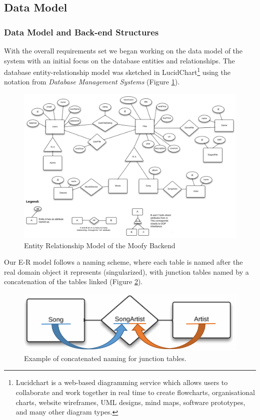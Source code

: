 \subsection{Data Model}
\subsubsection{Data Model and Back-end Structures}
\label{sec:datamodel}

With the overall requirements set we began working on the data model of the system with an initial focus on the database entities and relationships. The database entity-relationship model was sketched in LucidChart\footnote{Lucidchart is a web-based diagramming service which allows users to collaborate and work together in real time to create flowcharts, organisational charts, website wireframes, UML designs, mind maps, software prototypes, and many other diagram types.} using the notation from \emph{Database Management Systems}\cite{dbbook} (Figure \ref{fig:erd}).

\begin{figure}[ht]
	\centering
	\centerline{\includegraphics[scale=0.5]{./p1design/erdmodel.png}}
	\caption{Entity Relationship Model of the Moofy Backend}
	\label{fig:erd}
\end{figure}

Our E-R model follows a naming scheme, where each table is named after the real domain object it represents (singularized), with junction tables named by a concatenation of the tables linked (Figure \ref{fig:junctionfigure}).


\begin{figure}[hbt]
	\centering
	\includegraphics[scale=0.34]{./p1design/junctionfigure.png}
	\caption{Example of concatenated naming for junction tables.}
	\label{fig:junctionfigure}
\end{figure}



